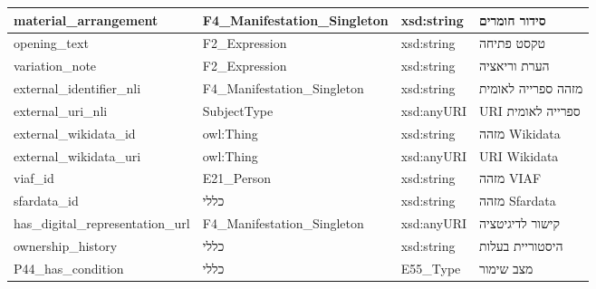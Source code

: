 {\begin{longtable}{|p{4cm}|p{3.5cm}|p{3.5cm}|p{4.5cm}|}
\hline
\textenglish{material\_arrangement} & \textenglish{F4\_Manifestation\_Singleton} & \textenglish{xsd:string} & סידור חומרים \\
\hline
\textenglish{opening\_text} & \textenglish{F2\_Expression} & \textenglish{xsd:string} & טקסט פתיחה \\
\hline
\textenglish{variation\_note} & \textenglish{F2\_Expression} & \textenglish{xsd:string} & הערת וריאציה \\
\hline
\textenglish{external\_identifier\_nli} & \textenglish{F4\_Manifestation\_Singleton} & \textenglish{xsd:string} & מזהה ספרייה לאומית \\
\hline
\textenglish{external\_uri\_nli} & \textenglish{SubjectType} & \textenglish{xsd:anyURI} & \textenglish{URI} ספרייה לאומית \\
\hline
\textenglish{external\_wikidata\_id} & \textenglish{owl:Thing} & \textenglish{xsd:string} & מזהה \textenglish{Wikidata} \\
\hline
\textenglish{external\_wikidata\_uri} & \textenglish{owl:Thing} & \textenglish{xsd:anyURI} & \textenglish{URI Wikidata} \\
\hline
\textenglish{viaf\_id} & \textenglish{E21\_Person} & \textenglish{xsd:string} & מזהה \textenglish{VIAF} \\
\hline
\textenglish{sfardata\_id} & כללי & \textenglish{xsd:string} & מזהה \textenglish{Sfardata} \\
\hline
\textenglish{has\_digital\_representation\_url} & \textenglish{F4\_Manifestation\_Singleton} & \textenglish{xsd:anyURI} & קישור לדיגיטציה \\
\hline
\textenglish{ownership\_history} & כללי & \textenglish{xsd:string} & היסטוריית בעלות \\
\hline
\textenglish{P44\_has\_condition} & כללי & \textenglish{E55\_Type} & מצב שימור \\
\hline
\end{longtable}
}

